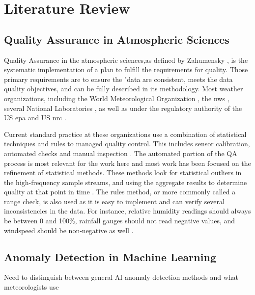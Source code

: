 \section{Literature Review}
\label{sec:literature_review}
\subsection{Quality Assurance in Atmospheric Sciences}

Quality Assurance in the atmospheric sciences,as defined by Zahumensky \cite{zahumenskyGuidelinesQualityControl2004}, is the systematic implementation of a plan to fulfill the requirements for quality.  Those primary requirements are to ensure the "data are consistent, meets the data quality objectives, and can be fully described in its methodology.  Most weather organizations, including the World Meteorological Organization \cite{zahumenskyGuidelinesQualityControl2004}, the \gls{nws}  \cite{northropQUALITYASSURANCEPROGRAM2019}, several National Laboratories \cite{SRNLTR202000197Pdf}, as well as under the regulatory authority of the US \gls{epa} \cite{ElectronicCodeFederal} and US \gls{nrc} \cite{ML070630021Pdf}.

Current standard practice at these organizations use a combination of statistical techniques and rules to managed quality control.  This includes sensor calibration, automated checks and manual inspection \cite{graybealComplexQualityAssurance2004}.  The automated portion of the QA process is most relevant for the work here and most work has been focused on the refinement of statistical methods.  These methods look for statistical outliers in the high-frequency sample streams, and using the aggregate results to determine quality at that point in time \cite{campbellQuantityNothingQuality2013}.  The rules method, or more commonly called a range check, is also used as it is easy to implement and can verify several inconsistencies in the data.  For instance, relative humidity readings should always be between 0 and 100\%, rainfall gauges should not read negative values, and windspeed should be non-negative as well \cite{hillakerDailyClimateData2009} \cite{fiebrichQualityAssuranceProcedures2010}.

\subsection{Anomaly Detection in Machine Learning}

Need to distinguish between general AI anomaly detection methods and what meteorologists use

